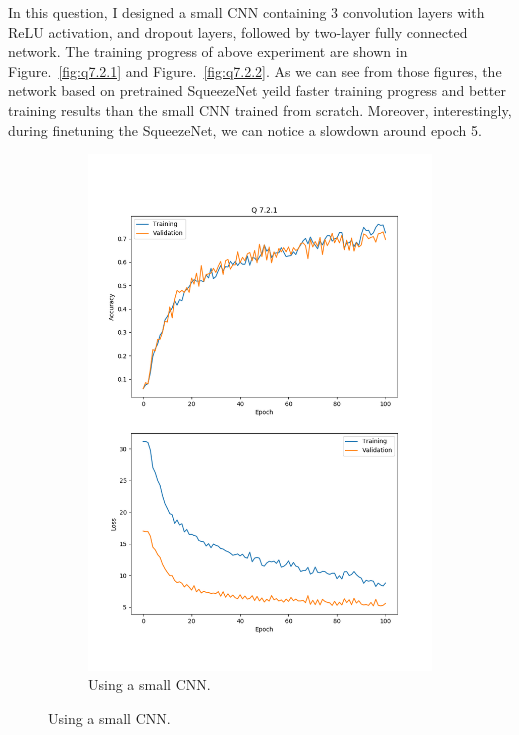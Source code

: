 \documentclass[11pt]{article}
\begin{document}
In this question, I designed a small CNN containing 3 convolution layers with ReLU activation, and dropout layers, followed by two-layer fully connected network.
The training progress of above experiment are shown in Figure.~\ref{fig:q7.2.1} and Figure.~\ref{fig:q7.2.2}.
As we can see from those figures, the network based on pretrained SqueezeNet yeild faster training progress and better training results than the small CNN trained from scratch.
Moreover, interestingly, during finetuning the SqueezeNet, we can notice a slowdown around epoch 5.

\begin{figure}[h!]
    \begin{subfigure}{.495\textwidth}
      \centering
      \includegraphics[width=.9\linewidth]{../results/q7_2_1_17_small.png}
      \caption{Using a small CNN. }

\end{subfigure}
\end{figure}
\end{document}
